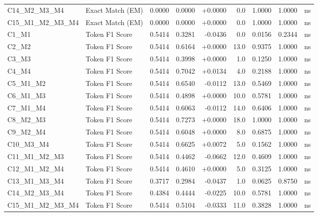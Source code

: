 \begin{table}[p]
\begin{tabular*}{\textwidth}{@{\extracolsep{\fill}} l l r r r r r r c @{}}
\addlinespace
C14\_M2\_M3\_M4 & Exact Match (EM)     & 0.0000 & 0.0000 & +0.0000 & 0.0 & 1.0000 & 1.0000 & ns \\
\addlinespace
C15\_M1\_M2\_M3\_M4 & Exact Match (EM)     & 0.0000 & 0.0000 & +0.0000 & 0.0 & 1.0000 & 1.0000 & ns \\
\addlinespace
C1\_M1          & Token F1 Score       & 0.5414 & 0.3281 & -0.0436 & 0.0 & 0.0156 & 0.2344 & ns \\
\addlinespace
C2\_M2          & Token F1 Score       & 0.5414 & 0.6164 & +0.0000 & 13.0 & 0.9375 & 1.0000 & ns \\
\addlinespace
C3\_M3          & Token F1 Score       & 0.5414 & 0.3998 & +0.0000 & 1.0 & 0.1250 & 1.0000 & ns \\
\addlinespace
C4\_M4          & Token F1 Score       & 0.5414 & 0.7042 & +0.0134 & 4.0 & 0.2188 & 1.0000 & ns \\
\addlinespace
C5\_M1\_M2      & Token F1 Score       & 0.5414 & 0.6540 & -0.0112 & 13.0 & 0.5469 & 1.0000 & ns \\
\addlinespace
C6\_M1\_M3      & Token F1 Score       & 0.5414 & 0.4898 & +0.0000 & 10.0 & 0.5781 & 1.0000 & ns \\
\addlinespace
C7\_M1\_M4      & Token F1 Score       & 0.5414 & 0.6063 & -0.0112 & 14.0 & 0.6406 & 1.0000 & ns \\
\addlinespace
C8\_M2\_M3      & Token F1 Score       & 0.5414 & 0.7273 & +0.0000 & 18.0 & 1.0000 & 1.0000 & ns \\
\addlinespace
C9\_M2\_M4      & Token F1 Score       & 0.5414 & 0.6048 & +0.0000 & 8.0 & 0.6875 & 1.0000 & ns \\
\addlinespace
C10\_M3\_M4     & Token F1 Score       & 0.5414 & 0.6625 & +0.0072 & 5.0 & 0.1562 & 1.0000 & ns \\
\addlinespace
C11\_M1\_M2\_M3 & Token F1 Score       & 0.5414 & 0.4462 & -0.0662 & 12.0 & 0.4609 & 1.0000 & ns \\
\addlinespace
C12\_M1\_M2\_M4 & Token F1 Score       & 0.5414 & 0.4610 & +0.0000 & 5.0 & 0.3125 & 1.0000 & ns \\
\addlinespace
C13\_M1\_M3\_M4 & Token F1 Score       & 0.3717 & 0.2984 & -0.0437 & 1.0 & 0.0625 & 0.8750 & ns \\
\addlinespace
C14\_M2\_M3\_M4 & Token F1 Score       & 0.4384 & 0.4444 & -0.0225 & 10.0 & 0.5781 & 1.0000 & ns \\
\addlinespace
C15\_M1\_M2\_M3\_M4 & Token F1 Score       & 0.5414 & 0.5104 & -0.0333 & 11.0 & 0.3828 & 1.0000 & ns \\

\end{tabular*}
\end{table}
